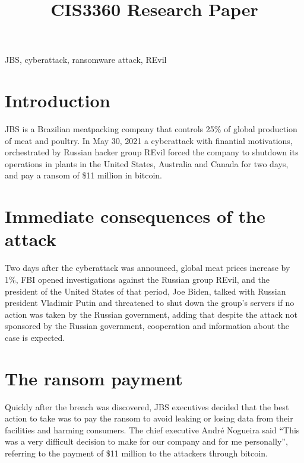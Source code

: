 \documentclass[conference]{IEEEtran}
\begin{document}
\title{CIS3360 Research Paper\\}

\author{
}

\maketitle

\begin{IEEEkeywords}
JBS, cyberattack, ransomware attack, REvil
\end{IEEEkeywords}

\section{Introduction}
JBS is a Brazilian meatpacking company that controls 25\% of global production of meat and poultry. In May 30, 2021 a cyberattack with finantial motivations, orchestrated by Russian hacker group REvil forced the company to shutdown its operations in plants in the United States, Australia and Canada for two days, and pay a ransom of \$11 million in bitcoin. 

\section{Immediate consequences of the attack}
Two days after the cyberattack was announced, global meat prices increase by 1\%, FBI opened investigations against the Russian group REvil, and the president of the United States of that period, Joe Biden, talked with Russian president Vladimir Putin and threatened to shut down the group's servers if no action was taken by the Russian government, adding that despite the attack not sponsored by the Russian government, cooperation and information about the case is expected.

\section{The ransom payment}
Quickly after the breach was discovered, JBS executives decided that the best action to take was to pay the ransom to avoid leaking or losing data from their facilities and harming consumers. The chief executive André Nogueira said ``This was a very difficult decision to make for our company and for me personally'', referring to the payment of \$11 million to the attackers through bitcoin.
\end{document}
